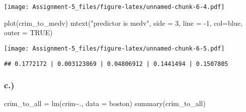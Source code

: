 \documentclass[
]{article}
\newenvironment{Shaded}{\begin{snugshade}}{\end{snugshade}}
\newcommand{\AttributeTok}[1]{\textcolor[rgb]{0.77,0.63,0.00}{#1}}
\newcommand{\ConstantTok}[1]{\textcolor[rgb]{0.00,0.00,0.00}{#1}}
\newcommand{\DecValTok}[1]{\textcolor[rgb]{0.00,0.00,0.81}{#1}}
\newcommand{\FunctionTok}[1]{\textcolor[rgb]{0.00,0.00,0.00}{#1}}
\newcommand{\NormalTok}[1]{#1}
\newcommand{\OtherTok}[1]{\textcolor[rgb]{0.56,0.35,0.01}{#1}}
\newcommand{\SpecialCharTok}[1]{\textcolor[rgb]{0.00,0.00,0.00}{#1}}
\newcommand{\StringTok}[1]{\textcolor[rgb]{0.31,0.60,0.02}{#1}}
\begin{document}
\texttt{[image: Assignment-5\_files/figure-latex/unnamed-chunk-6-4.pdf]}

\begin{Shaded}
\begin{Highlighting}[]
\FunctionTok{plot}\NormalTok{(crim\_to\_medv)}
\FunctionTok{mtext}\NormalTok{(}\StringTok{"predictor is medv"}\NormalTok{, }\AttributeTok{side =} \DecValTok{3}\NormalTok{, }\AttributeTok{line =} \SpecialCharTok{{-}}\DecValTok{1}\NormalTok{, }\AttributeTok{col=}\StringTok{\textquotesingle{}blue\textquotesingle{}}\NormalTok{, }\AttributeTok{outer =} \ConstantTok{TRUE}\NormalTok{)}
\end{Highlighting}
\end{Shaded}

\texttt{[image: Assignment-5\_files/figure-latex/unnamed-chunk-6-5.pdf]}

\begin{Shaded}
\end{Shaded}

\begin{verbatim}
## 0.1772172 | 0.003123869 | 0.04806912 | 0.1441494 | 0.1507805
\end{verbatim}

\hypertarget{c.-1}{%
\subsubsection{c.)}\label{c.-1}}

\begin{Shaded}
\begin{Highlighting}[]
\NormalTok{crim\_to\_all }\OtherTok{=} \FunctionTok{lm}\NormalTok{(crim}\SpecialCharTok{\textasciitilde{}}\NormalTok{., }\AttributeTok{data =}\NormalTok{ boston)}
\FunctionTok{summary}\NormalTok{(crim\_to\_all)}
\end{Highlighting}
\end{Shaded}
\end{document}
